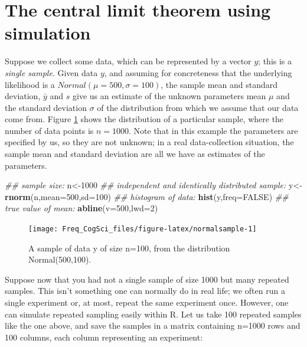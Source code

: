 \documentclass[12pt,]{krantz}
\newenvironment{Shaded}{\begin{snugshade}}{\end{snugshade}}
\newcommand{\CommentTok}[1]{\textcolor[rgb]{0.56,0.35,0.01}{\textit{#1}}}
\newcommand{\DataTypeTok}[1]{\textcolor[rgb]{0.13,0.29,0.53}{#1}}
\newcommand{\DecValTok}[1]{\textcolor[rgb]{0.00,0.00,0.81}{#1}}
\newcommand{\KeywordTok}[1]{\textcolor[rgb]{0.13,0.29,0.53}{\textbf{#1}}}
\newcommand{\NormalTok}[1]{#1}
\newcommand{\OtherTok}[1]{\textcolor[rgb]{0.56,0.35,0.01}{#1}}
\begin{document}
\hypertarget{the-central-limit-theorem-using-simulation}{%
\section{The central limit theorem using simulation}\label{the-central-limit-theorem-using-simulation}}

Suppose we collect some data, which can be represented by a vector \(y\); this is a \emph{single sample}. Given data \(y\), and assuming for concreteness that the underlying likelihood is a \(Normal(\mu=500,\sigma=100)\), the sample mean and standard deviation, \(\bar{y}\) and \(s\) give us an estimate of the unknown parameters mean \(\mu\) and the standard deviation \(\sigma\) of the distribution from which we assume that our data come from. Figure \ref{fig:normalsample} shows the distribution of a particular sample, where the number of data points is \(n=1000\). Note that in this example the parameters are specified by us, so they are not unknown; in a real data-collection situation, the sample mean and standard deviation are all we have as estimates of the parameters.

\begin{Shaded}
\begin{Highlighting}[]
\CommentTok{## sample size:}
\NormalTok{n<-}\DecValTok{1000}
\CommentTok{##  independent and identically distributed sample:}
\NormalTok{y<-}\KeywordTok{rnorm}\NormalTok{(n,}\DataTypeTok{mean=}\DecValTok{500}\NormalTok{,}\DataTypeTok{sd=}\DecValTok{100}\NormalTok{)}
\CommentTok{## histogram of data:}
\KeywordTok{hist}\NormalTok{(y,}\DataTypeTok{freq=}\OtherTok{FALSE}\NormalTok{)}
\CommentTok{## true value of mean:}
\KeywordTok{abline}\NormalTok{(}\DataTypeTok{v=}\DecValTok{500}\NormalTok{,}\DataTypeTok{lwd=}\DecValTok{2}\NormalTok{)}
\end{Highlighting}
\end{Shaded}

\begin{figure}
\texttt{[image: Freq\_CogSci\_files/figure-latex/normalsample-1]} \caption{A sample of data y of size n=100, from the distribution  Normal(500,100).}\label{fig:normalsample}
\end{figure}

Suppose now that you had not a single sample of size 1000 but many repeated samples. This isn't something one can normally do in real life; we often run a single experiment or, at most, repeat the same experiment once. However, one can simulate repeated sampling easily within R. Let us take 100 repeated samples like the one above, and save the samples in a matrix containing n=1000 rows and 100 columns, each column representing an experiment:
\end{document}
